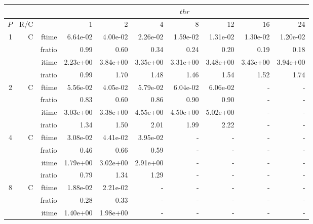 \documentclass[a4paper]{article}
\begin{document}
\begin{table}[htbp]
\begin{center}
\begin{small}
\begin{tabular}{|r|r|r|r|r|r|r|r|r|r|}
\hline 
     & & & \multicolumn{7}{c|}{$thr$} \\ \hline
    $P$ & R/C &  & 1           & 2    & 4    & 8    & 12   & 16    & 24  \\ \hline\hline
     1 & C & ftime & 6.64e-02 & 4.00e-02 & 2.26e-02 & 1.59e-02 & 1.31e-02 & 1.30e-02 & 1.20e-02 \\   
          &      & fratio & 0.99 & 0.60 & 0.34 & 0.24 & 0.20 & 0.19 & 0.18 \\   
          &      & itime & 2.23e+00 & 3.84e+00 & 3.35e+00 & 3.31e+00 & 3.48e+00 & 3.43e+00 & 3.94e+00 \\   
          &      & iratio & 0.99 & 1.70 & 1.48 & 1.46 & 1.54 & 1.52 & 1.74 \\ \hline 
     2 & C & ftime & 5.56e-02 & 4.05e-02 & 5.79e-02 & 6.04e-02 & 6.06e-02 &     -     &     -     \\   
          &      & fratio & 0.83 & 0.60 & 0.86 & 0.90 & 0.90 &     -     &     -     \\   
          &      & itime & 3.03e+00 & 3.38e+00 & 4.55e+00 & 4.50e+00 & 5.02e+00 &     -     &     -     \\   
          &      & iratio & 1.34 & 1.50 & 2.01 & 1.99 & 2.22 &     -     &     -     \\ \hline 
     4 & C & ftime & 3.08e-02 & 4.41e-02 & 3.95e-02 &     -     &     -     &     -     &     -     \\   
          &      & fratio & 0.46 & 0.66 & 0.59 &     -     &     -     &     -     &     -     \\   
          &      & itime & 1.79e+00 & 3.02e+00 & 2.91e+00 &     -     &     -     &     -     &     -     \\   
          &      & iratio & 0.79 & 1.34 & 1.29 &     -     &     -     &     -     &     -     \\ \hline 
     8 & C & ftime & 1.88e-02 & 2.21e-02 &     -     &     -     &     -     &     -     &     -     \\   
          &      & fratio & 0.28 & 0.33 &     -     &     -     &     -     &     -     &     -     \\   
          &      & itime & 1.40e+00 & 1.98e+00 &     -     &     -     &     -     &     -     &     -     \\   

\end{tabular}
\end{small}
\end{center}
\end{table}
\end{document}
